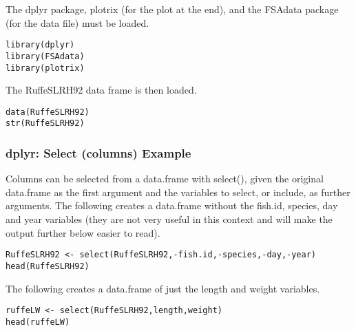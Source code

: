 \documentclass{beamer}
\begin{document}
\begin{frame}[verbatim]
The dplyr package, plotrix (for the plot at the end), and the FSAdata package (for the data file) must be loaded.
\begin{framed}
\begin{verbatim}
library(dplyr)
library(FSAdata)
library(plotrix)
\end{verbatim}
\end{framed}

\end{frame}
\begin{frame}[verbatim]
The RuffeSLRH92 data frame is then loaded.

\begin{framed}
\begin{verbatim}
data(RuffeSLRH92)
str(RuffeSLRH92)
\end{verbatim}
\end{framed}

\end{frame}
\begin{frame}[verbatim]
\frametitle{dplyr: Select (columns) Example}
Columns can be selected from a data.frame with select(), given the original data.frame as the first argument and the variables to select, or include, as further arguments. The following creates a data.frame without the fish.id, species, day and year variables (they are not very useful in this context and will make the output further below easier to read).
\begin{framed}
\begin{verbatim}
RuffeSLRH92 <- select(RuffeSLRH92,-fish.id,-species,-day,-year)
head(RuffeSLRH92)
\end{verbatim}
\end{framed}

\end{frame}
\begin{frame}[verbatim]

The following creates a data.frame of just the length and weight variables.

\begin{framed}
\begin{verbatim}
ruffeLW <- select(RuffeSLRH92,length,weight)
head(ruffeLW)

\end{verbatim}
\end{framed}

\end{frame}
\end{document}
